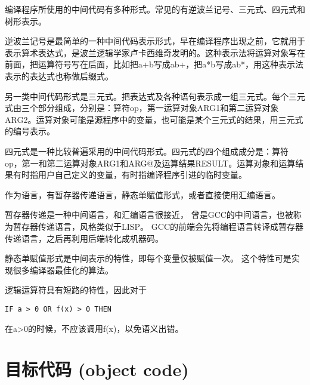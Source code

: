 ﻿\documentclass{article}
\begin{document}

编译程序所使用的中间代码有多种形式。常见的有逆波兰记号、三元式、四元式和树形表示。

逆波兰记号是最简单的一种中间代码表示形式，早在编译程序出现之前，它就用于表示算术表达式，是波兰逻辑学家卢卡西维奇发明的。这种表示法将运算对象写在前面，把运算符号写在后面，比如把a+b写成ab+，把a*b写成ab*，用这种表示法表示的表达式也称做后缀式。

另一类中间代码形式是三元式。把表达式及各种语句表示成一组三元式。每个三元式由三个部分组成，分别是：算符op，第一运算对象ARG1和第二运算对象ARG2。运算对象可能是源程序中的变量，也可能是某个三元式的结果，用三元式的编号表示。

四元式是一种比较普遍采用的中间代码形式。四元式的四个组成成分是：算符op，第一和第二运算对象ARG1和ARG@及运算结果RESULT。运算对象和运算结果有时指用户自己定义的变量，有时指编译程序引进的临时变量。

作为语言，有暂存器传递语言，静态单赋值形式，或者直接使用汇编语言。

暂存器传递是一种中间语言，和汇编语言很接近，
曾是GCC的中间语言，也被称为暂存器传递语言，风格类似于LISP。
GCC的前端会先将编程语言转译成暂存器传递语言，之后再利用后端转化成机器码。

静态单赋值形式是中间表示的特性，即每个变量仅被赋值一次。
这个特性可是实现很多编译器最佳化的算法。

逻辑运算符具有短路的特性，因此对于
\begin{lstlisting}
IF a > 0 OR f(x) > 0 THEN 
\end{lstlisting}
在a>0的时候，不应该调用f(x)，以免语义出错。

   
\section{目标代码 (object code)}
\end{document}
